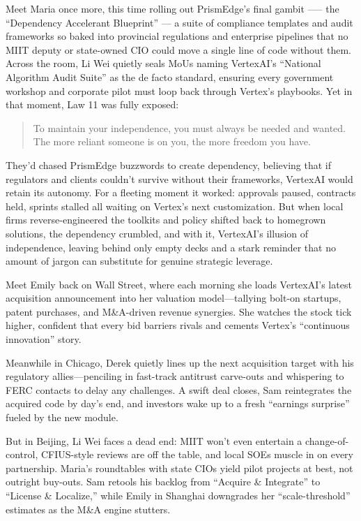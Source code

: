 Meet Maria once more, this time rolling out PrismEdge’s final gambit --— the “Dependency Accelerant Blueprint” --- 
a suite of compliance templates and audit frameworks so baked into provincial regulations and enterprise pipelines 
that no MIIT 
deputy or state-owned CIO could move a single line of code without them. Across the room, Li Wei quietly seals MoUs 
naming VertexAI’s “National Algorithm Audit Suite” as the de facto standard, ensuring every government workshop and 
corporate pilot must loop back through Vertex’s playbooks. Yet in that moment, Law 11 was fully exposed:

\begin{quote}
To maintain your independence, you must always be needed and wanted. The more reliant someone is on you, the more 
freedom you have.
\end{quote}

They’d chased PrismEdge buzzwords to create dependency, believing that if regulators and clients couldn’t 
survive without their frameworks, VertexAI would retain its autonomy. For a fleeting moment it 
worked: approvals paused, contracts held, sprints stalled all waiting on Vertex’s next customization. But 
when local firms reverse-engineered the toolkits and policy shifted back to homegrown solutions, the 
dependency crumbled, and with it, VertexAI’s illusion of independence, leaving behind only empty decks and 
a stark reminder that no amount of jargon can substitute for genuine strategic leverage.

Meet Emily back on Wall Street, where each morning she loads VertexAI’s latest acquisition announcement 
into her valuation model—tallying bolt-on startups, patent purchases, and M\&A-driven revenue synergies. 
She watches the stock tick higher, confident that every bid barriers rivals and cements Vertex’s 
“continuous innovation” story.

Meanwhile in Chicago, Derek quietly lines up the next acquisition target with his regulatory allies—penciling 
in fast-track antitrust carve-outs and whispering to FERC contacts to delay any challenges. A swift deal 
closes, Sam reintegrates the acquired code by day’s end, and investors wake up to a fresh “earnings surprise” 
fueled by the new module.

But in Beijing, Li Wei faces a dead end: MIIT won’t even entertain a change-of-control, CFIUS-style reviews 
are off the table, and local SOEs muscle in on every partnership. Maria’s roundtables with state CIOs yield 
pilot projects at best, not outright buy-outs. Sam retools his backlog from “Acquire \& Integrate” to “License
 \& Localize,” while Emily in Shanghai downgrades her “scale-threshold” estimates as the M\&A engine stutters.


